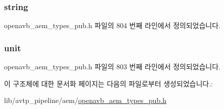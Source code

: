 \subsubsection[{\texorpdfstring{string}{string}}]{ string}\hypertarget{structopenavb__aem__control__value__format__control__linear__uint16__t_a1f81001cefa769cb3651172fd5ab0748}{}\label{structopenavb__aem__control__value__format__control__linear__uint16__t_a1f81001cefa769cb3651172fd5ab0748}


openavb\+\_\+aem\+\_\+types\+\_\+pub.\+h 파일의 804 번째 라인에서 정의되었습니다.

\subsubsection[{\texorpdfstring{unit}{unit}}]{ unit}\hypertarget{structopenavb__aem__control__value__format__control__linear__uint16__t_a0b3ff376c10369016824076deacc055e}{}\label{structopenavb__aem__control__value__format__control__linear__uint16__t_a0b3ff376c10369016824076deacc055e}


openavb\+\_\+aem\+\_\+types\+\_\+pub.\+h 파일의 803 번째 라인에서 정의되었습니다.



이 구조체에 대한 문서화 페이지는 다음의 파일로부터 생성되었습니다.\+:\begin{DoxyCompactItemize}
\item 
lib/avtp\+\_\+pipeline/aem/\hyperlink{openavb__aem__types__pub_8h}{openavb\+\_\+aem\+\_\+types\+\_\+pub.\+h}\end{DoxyCompactItemize}
